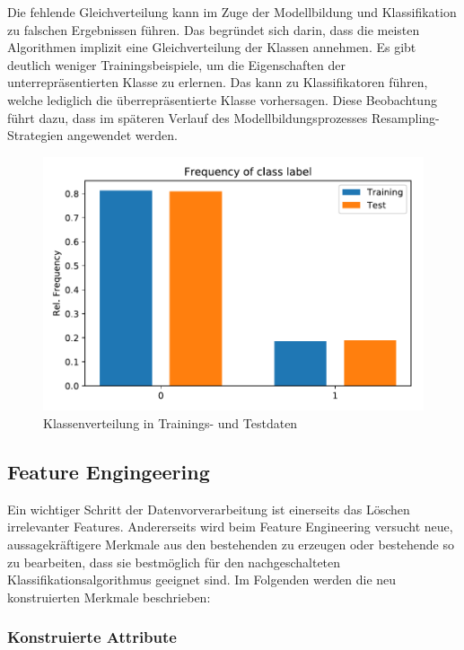 Die fehlende Gleichverteilung kann im Zuge der Modellbildung und Klassifikation zu falschen Ergebnissen führen. Das begründet sich darin, dass die meisten Algorithmen implizit eine Gleichverteilung der Klassen annehmen. Es gibt deutlich weniger Trainingsbeispiele, um die Eigenschaften der unterrepräsentierten Klasse zu erlernen. Das kann zu Klassifikatoren führen, welche lediglich die überrepräsentierte Klasse vorhersagen. Diese Beobachtung führt dazu, dass im späteren Verlauf des Modellbildungsprozesses Resampling-Strategien angewendet werden.

\begin{figure}[!htbp]
\begin{center}
\includegraphics[scale=0.5]{pdf/distTrainTest.pdf}
\end{center}
\caption{Klassenverteilung in Trainings- und Testdaten}
\label{fig:classDist}
\end{figure}
\FloatBarrier
\pagebreak

\subsection{Feature Engingeering}
Ein wichtiger Schritt der Datenvorverarbeitung ist einerseits das Löschen irrelevanter Features. Andererseits wird beim Feature Engineering versucht neue, aussagekräftigere Merkmale aus den bestehenden zu erzeugen oder bestehende so zu bearbeiten, dass sie bestmöglich für den nachgeschalteten Klassifikationsalgorithmus geeignet sind. Im Folgenden werden die neu konstruierten Merkmale beschrieben:

\subsubsection{Konstruierte Attribute}

